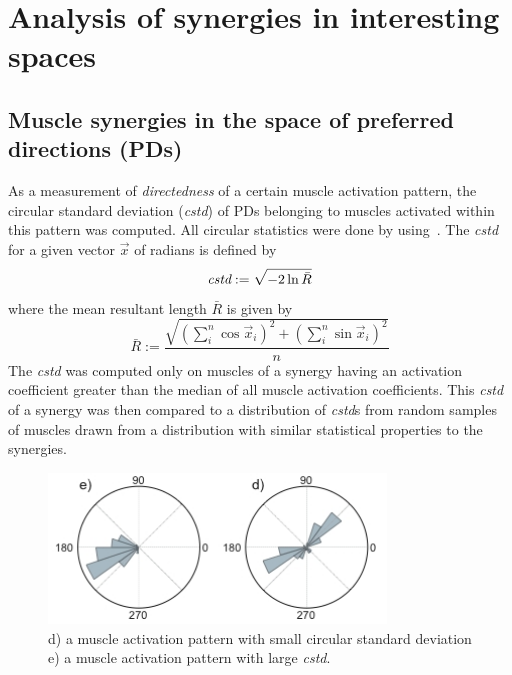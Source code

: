 





\section{Analysis of synergies in interesting spaces} %
\label{sg:sec:syn_comp}


\subsection{Muscle synergies in the space of preferred directions (PDs)} %
\label{sg:sub:pd}

As a measurement of \emph{directedness} of a certain muscle activation pattern, the circular standard deviation (\emph{cstd}) of PDs belonging to muscles activated within this pattern was computed. All circular statistics were done by using~\citet{circ_stat}. The \emph{cstd} for a given vector $\vec{x}$ of radians is defined by 
\begin{equation}
	\emph{cstd} := \sqrt{-2 \ln{\bar{R}}}
\end{equation}
where the mean resultant length $\bar{R}$ is given by 
\begin{equation}
	\bar{R} := \frac
					{ \sqrt{ {(\sum_{i}^n \cos  \vec{x}_i)}^2 + {(\sum_{i}^n \sin \vec{x}_i)}^2 }}
					{n}
\end{equation}
The \emph{cstd} was computed only on muscles of a synergy having an activation coefficient greater than the median of all muscle activation coefficients. This \emph{cstd} of a synergy was then compared
to a distribution of \emph{cstd}s from random samples of muscles drawn from a distribution with similar statistical properties to the synergies.


\begin{figure}[ht]
	\centering
		\includegraphics[width=0.8\textwidth]{images/cstd.jpg}
	\caption
	{
	d) a muscle activation pattern with small circular standard deviation \\
	e) a muscle activation pattern with large \emph{cstd}.
	}
	\label{sg:fig:images_cstd}
\end{figure}


